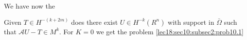 We have now the 
\begin{problem}\label{lec18:sec10:subsec2:prob10.2}%
  Given $T \in H^{-(k + 2m)}$ does there exist $U \in
  H^{-k} (R^n)$ with support in $\bar{\Omega}$ such that $\mathscr{A} U
  - T \in M^k$. For $K = 0$ we get the problem \ref{lec18:sec10:subsec2:prob10.1} 
\end{problem}
